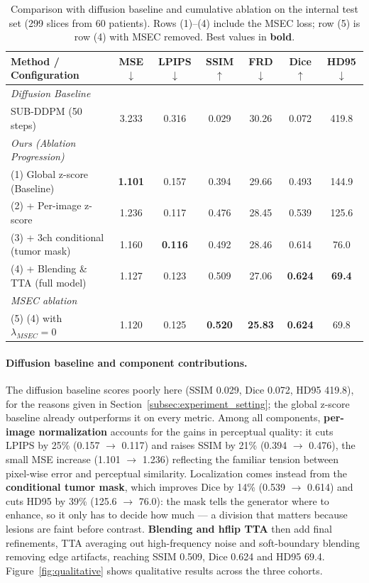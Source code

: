 \documentclass[runningheads,a4paper]{llncs}
\begin{document}
\begin{table}[!t]
\centering
\small
\caption{Comparison with diffusion baseline and cumulative ablation on the internal test set (299 slices from 60 patients). Rows (1)--(4) include the MSEC loss; row (5) is row (4) with MSEC removed. Best values in \textbf{bold}.}
\label{tab:merged_results}
\begin{tabular}{lcccccc}
\toprule
Method / Configuration & MSE $\downarrow$ & LPIPS $\downarrow$ & SSIM $\uparrow$ & FRD $\downarrow$ & Dice $\uparrow$ & HD95 $\downarrow$ \\
\midrule
\textit{Diffusion Baseline} & & & & & & \\
SUB-DDPM (50 steps) \cite{ibarra2025diffusion} & 3.233 & 0.316 & 0.029 & 30.26 & 0.072 & 419.8 \\
\midrule
\textit{Ours (Ablation Progression)} & & & & & & \\
(1) Global z-score (Baseline) & \textbf{1.101} & 0.157 & 0.394 & 29.66 & 0.493 & 144.9 \\
(2) + Per-image z-score & 1.236 & 0.117 & 0.476 & 28.45 & 0.539 & 125.6 \\
(3) + 3ch conditional (tumor mask) & 1.160 & \textbf{0.116} & 0.492 & 28.46 & 0.614 & 76.0 \\
(4) + Blending \& TTA (full model) & 1.127 & 0.123 & 0.509 & 27.06 & \textbf{0.624} & \textbf{69.4} \\
\midrule
\textit{MSEC ablation} & & & & & & \\
(5) (4) with $\lambda_{MSEC}=0$ & 1.120 & 0.125 & \textbf{0.520} & \textbf{25.83} & \textbf{0.624} & 69.8 \\
\bottomrule
\end{tabular}
\end{table}

\paragraph{Diffusion baseline and component contributions.}
The diffusion baseline scores poorly here (SSIM 0.029, Dice 0.072, HD95 419.8), for the reasons given in Section~\ref{subsec:experiment_setting}; the global z-score baseline already outperforms it on every metric. Among all components, \textbf{per-image normalization}  accounts for the gains in perceptual quality: it cuts LPIPS by 25\% (0.157 $\to$ 0.117) and raises SSIM by 21\% (0.394 $\to$ 0.476), the small MSE increase (1.101 $\to$ 1.236) reflecting the familiar tension between pixel-wise error and perceptual similarity. Localization comes instead from the \textbf{conditional tumor mask}, which improves Dice by 14\% (0.539 $\to$ 0.614) and cuts HD95 by 39\% (125.6 $\to$ 76.0): the mask tells the generator where to enhance, so it only has to decide how much --- a division that matters because lesions are faint before contrast. \textbf{Blending and hflip TTA} then add final refinements, TTA averaging out high-frequency noise and soft-boundary blending removing edge artifacts, reaching SSIM 0.509, Dice 0.624 and HD95 69.4. Figure~\ref{fig:qualitative} shows qualitative results across the three cohorts.
\end{document}
